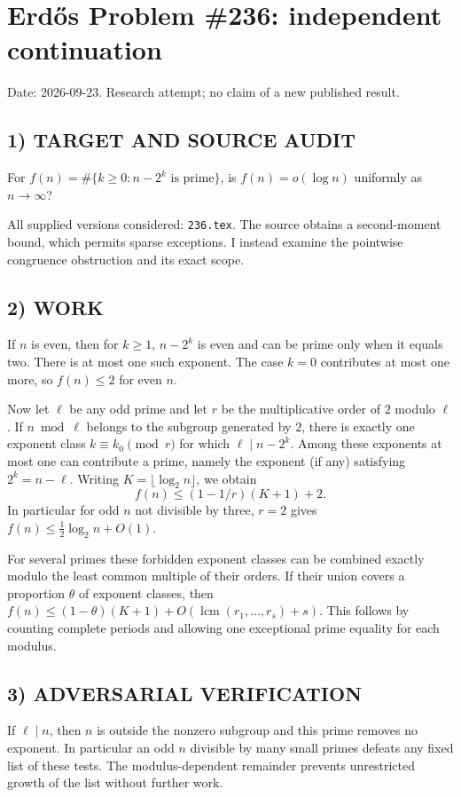 \section{Erd\H{o}s Problem \#236: independent continuation}
\noindent Date: 2026-09-23. Research attempt; no claim of a new published result.
\subsection{1) TARGET AND SOURCE AUDIT}
For $f(n)=\#\{k\ge0:n-2^k\text{ is prime}\}$, is $f(n)=o(\log n)$ uniformly as $n\to\infty$?

All supplied versions considered: \texttt{236.tex}.
The source obtains a second-moment bound, which permits sparse exceptions. I instead examine the pointwise congruence obstruction and its exact scope.
\subsection{2) WORK}
If $n$ is even, then for $k\ge1$, $n-2^k$ is even and can be prime only when it equals two. There is at most one such exponent. The case $k=0$ contributes at most one more, so $f(n)\le2$ for even $n$.

Now let $\ell$ be any odd prime and let $r$ be the multiplicative order of $2$ modulo $\ell$. If $n\bmod\ell$ belongs to the subgroup generated by $2$, there is exactly one exponent class $k\equiv k_0\pmod r$ for which $\ell\mid n-2^k$. Among these exponents at most one can contribute a prime, namely the exponent (if any) satisfying $2^k=n-\ell$. Writing $K=\lfloor\log_2 n\rfloor$, we obtain
\[
f(n)\le (1-1/r)(K+1)+2.
\]
In particular for odd $n$ not divisible by three, $r=2$ gives $f(n)\le\tfrac12\log_2 n+O(1)$.

For several primes these forbidden exponent classes can be combined exactly modulo the least common multiple of their orders. If their union covers a proportion $\theta$ of exponent classes, then $f(n)\le(1-\theta)(K+1)+O(\operatorname{lcm}(r_1,\ldots,r_s)+s)$. This follows by counting complete periods and allowing one exceptional prime equality for each modulus.
\subsection{3) ADVERSARIAL VERIFICATION}
If $\ell\mid n$, then $n$ is outside the nonzero subgroup and this prime removes no exponent. In particular an odd $n$ divisible by many small primes defeats any fixed list of these tests. The modulus-dependent remainder prevents unrestricted growth of the list without further work.

